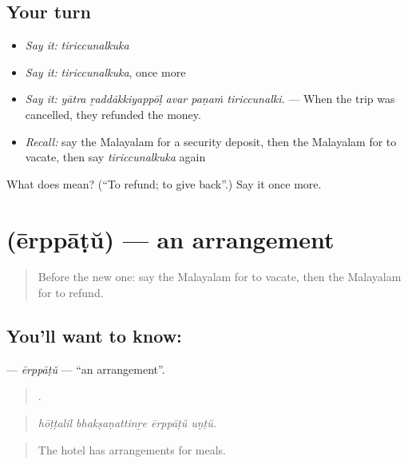 \subsection*{Your turn}
\begin{itemize}
\raggedright
  \item \emph{Say it:} \emph{tiriccunalkuka}
  \item \emph{Say it:} \emph{tiriccunalkuka}, once more
  \item \emph{Say it:} \emph{yātra ṟaddākkiyappōḷ avar paṇaṁ tiriccunalki.} — When the trip was cancelled, they refunded the money.
  \item \emph{Recall:} say the Malayalam for a security deposit, then the Malayalam for to vacate, then say \emph{tiriccunalkuka} again
\end{itemize}

\begin{tcolorbox}[breakable,colback=teal!4,colframe=teal!35!black,title={Before you move on}]
What does  mean? (\textquotedblleft{}To refund; to give back\textquotedblright{}.) Say it once more.
\end{tcolorbox}
\section[\texorpdfstring{\ml{ഏർപ്പാട്} (ērppāṭŭ)}{ഏർപ്പാട് (ērppāṭŭ)}]{ (ērppāṭŭ) — an arrangement}

\label{lesson:ML-C482-erppatu}



\begin{quote}
Before the new one: say the Malayalam for to vacate, then the Malayalam for to refund.
\end{quote}

\subsection*{You'll want to know: }
\textbf{} — \emph{ērppāṭŭ} — \textquotedblleft{}an arrangement\textquotedblright{}.

\begin{quote}
   .
\end{quote}

\begin{quote}
\emph{hōṭṭalil bhakṣaṇattinṟe ērppāṭŭ uṇṭŭ.}
\end{quote}

\begin{quote}
The hotel has arrangements for meals.
\end{quote}

